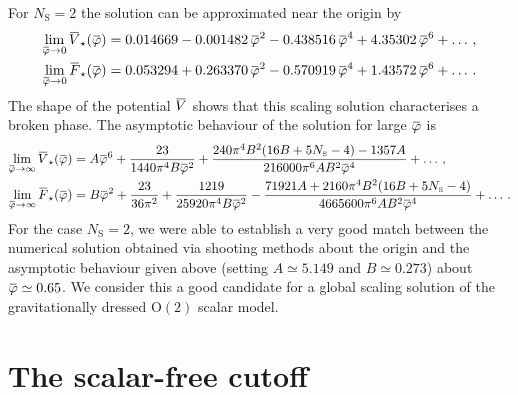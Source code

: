 \documentclass[11pt]{book} %
\newcommand{\overbar}[1]{\mkern 1.5mu\overline{\mkern-1.5mu#1\mkern-1.5mu}\mkern 1.5mu}
\newcommand\NS{ N_{\scriptscriptstyle{\mathrm{S}}} }
\newcommand{\bV}{\overbar V}
\newcommand{\bF}{\overbar F}
\newcommand{\bVstar}{\bV_\star}
\newcommand{\bFstar}{\bF_\star}
\newcommand{\bp}{\overbar \varphi}
\numberwithin{equation}{chapter}
\begin{document}

\noindent For $\NS=2$ the solution can be approximated near the origin by
\begin{align}
  \lim_{\bp \rightarrow 0} \bVstar(\bp) &= 0.014669 - 0.001482 \, \bp ^2 - 0.438516 \, \bp ^4 + 4.35302 \, \bp ^6 + \dots \,, \\
  \lim_{\bp \rightarrow 0} \bFstar(\bp) &= 0.053294 + 0.263370 \, \bp ^2 - 0.570919 \, \bp ^4 + 1.43572 \, \bp ^6 + \dots \,.
\end{align}
The shape of the potential $\bV$ shows that this scaling solution characterises a broken phase.
The asymptotic behaviour of the solution for large $\bp$ is
\begin{align}
  \lim_{\bp \rightarrow \infty} \bVstar(\bp) &= A \bp ^6 + \frac{23}{1440 \pi ^4 B \bp ^2}
                     + \frac{240 \pi ^4 B^2 (16 B+5 \NS-4)-1357 A}{216000 \pi ^6 A B^2 \bp ^4} + \dots \,, \\
  \lim_{\bp \rightarrow \infty} \bFstar(\bp) &= B \bp ^2 + \frac{23}{36 \pi ^2}+\frac{1219}{25920 \pi ^4 B \bp ^2}
                     - \frac{71921 A+2160 \pi ^4 B^2 (16 B+5 \NS-4)}{4665600 \pi ^6 A B^2 \bp ^4} + \dots \,.
\end{align}
For the case $\NS=2$, we were able to establish a very good match between the numerical solution
obtained via shooting methods about the origin and the asymptotic behaviour given above
(setting $A\simeq 5.149$ and $B\simeq 0.273$) about $\bp\simeq0.65$.
We consider this a good candidate for a global scaling solution of the gravitationally
dressed ${\mathrm O(2)}$ scalar model.


\section{The scalar-free cutoff}
\end{document}
